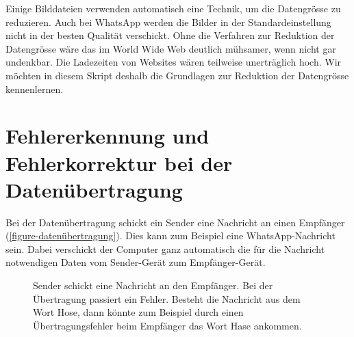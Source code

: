 Einige Bilddateien verwenden automatisch eine Technik, um die Datengrösse zu reduzieren. Auch bei WhatsApp werden die Bilder in der Standardeinstellung nicht in der besten Qualität verschickt. Ohne die Verfahren zur Reduktion der Datengrösse wäre das  im World Wide Web deutlich mühsamer, wenn nicht gar undenkbar. Die Ladezeiten von Websites wären teilweise unerträglich hoch. Wir möchten in diesem Skript deshalb die Grundlagen zur Reduktion der Datengrösse kennenlernen.

\newpage

\section{Fehlererkennung und Fehlerkorrektur bei der Datenübertragung}

Bei der Datenübertragung schickt ein Sender eine Nachricht an einen Empfänger (\autoref{figure-datenübertragung}). Dies kann zum Beispiel eine WhatsApp-Nachricht sein. Dabei verschickt der Computer ganz automatisch die für die Nachricht notwendigen Daten vom Sender-Gerät zum Empfänger-Gerät. 

\begin{figure}[htb]
\centering
{}
\caption{Sender schickt eine Nachricht an den Empfänger. Bei der Übertragung passiert ein Fehler. Besteht die Nachricht aus dem Wort Hose, dann könnte zum Beispiel durch einen Übertragungsfehler beim Empfänger das Wort Hase ankommen.}
\label{figure-datenübertragung}
\end{figure}


